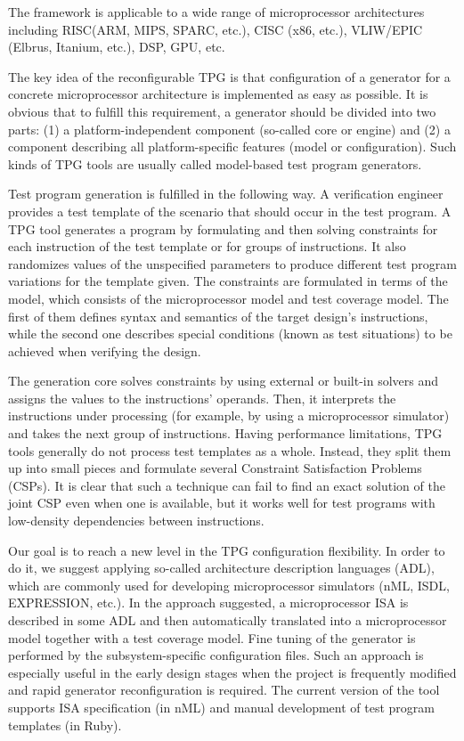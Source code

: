 \documentclass[oneside,final,12pt]{extreport}
\begin{document}
\bigskip

The framework is applicable to a wide range of microprocessor architectures including RISC(ARM, MIPS, SPARC, etc.), CISC (x86, etc.), VLIW/EPIC (Elbrus, Itanium, etc.), DSP, GPU, etc.

\bigskip

The key idea of the reconfigurable TPG is that configuration of a generator for a concrete microprocessor architecture is implemented as easy as possible. It is obvious that to fulfill this requirement, a generator should be divided into two parts: (1) a platform-independent component (so-called core or engine) and (2) a component describing all platform-specific features (model or configuration). Such kinds of TPG tools are usually called model-based test program generators. 

\bigskip

Test program generation is fulfilled in the following way. A verification engineer provides a test template of the scenario that should occur in the test program. A TPG tool generates a program by formulating and then solving constraints for each instruction of the test template or for groups of instructions. It also randomizes values of the unspecified parameters to produce different test program variations for the template given. The constraints are formulated in terms of the model, which consists of the microprocessor model and test coverage model. The first of them defines syntax and semantics of the target design's instructions, while the second one describes special conditions (known as test situations) to be achieved when verifying the design.
\bigskip

The generation core solves constraints by using external or built-in solvers and assigns the values to the instructions' operands. Then, it interprets the instructions under processing (for example, by using a microprocessor simulator) and takes the next group of instructions. Having performance limitations, TPG tools generally do not process test templates as a whole. Instead, they split them up into small pieces and formulate several Constraint Satisfaction Problems (CSPs). It is clear that such a technique can fail to find an exact solution of the joint CSP even when one is available, but it works well for test programs with low-density dependencies between instructions.

\bigskip

Our goal is to reach a new level in the TPG configuration flexibility. In order to do it, we suggest applying so-called architecture description languages (ADL), which are commonly used for developing microprocessor simulators (nML, ISDL, EXPRESSION, etc.). In the approach suggested, a microprocessor ISA is described in some ADL and then automatically translated into a microprocessor model together with a test coverage model. Fine tuning of the generator is performed by the subsystem-specific configuration files. Such an approach is especially useful in the early design stages when the project is frequently modified and rapid generator reconfiguration is required. The current version of the tool supports ISA specification (in nML) and manual development of test program templates (in Ruby).
\end{document}
